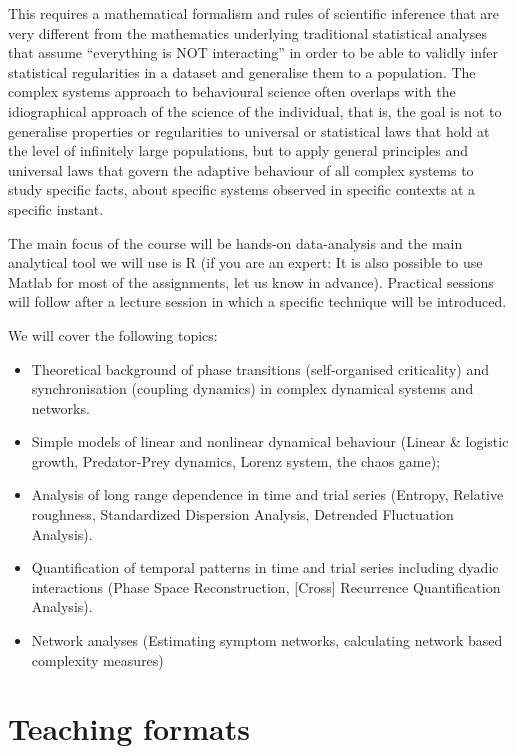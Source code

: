 \documentclass[12pt,]{book}
\providecommand{\tightlist}{%
  \setlength{\itemsep}{0pt}\setlength{\parskip}{0pt}}
\let\stdsection\section
\renewcommand\section{\newpage\stdsection}
\begin{document}
This requires a mathematical formalism and rules of scientific inference that are very different from the mathematics underlying traditional statistical analyses that assume ``everything is NOT interacting'' in order to be able to validly infer statistical regularities in a dataset and generalise them to a population. The complex systems approach to behavioural science often overlaps with the idiographical approach of the science of the individual, that is, the goal is not to generalise properties or regularities to universal or statistical laws that hold at the level of infinitely large populations, but to apply general principles and universal laws that govern the adaptive behaviour of all complex systems to study specific facts, about specific systems observed in specific contexts at a specific instant.

The main focus of the course will be hands-on data-analysis and the main analytical tool we will use is R (if you are an expert: It is also possible to use Matlab for most of the assignments, let us know in advance). Practical sessions will follow after a lecture session in which a specific technique will be introduced.

We will cover the following topics:

\begin{itemize}
\tightlist
\item
  Theoretical background of phase transitions (self-organised criticality) and synchronisation (coupling dynamics) in complex dynamical systems and networks.
\item
  Simple models of linear and nonlinear dynamical behaviour (Linear \& logistic growth, Predator-Prey dynamics, Lorenz system, the chaos game);
\item
  Analysis of long range dependence in time and trial series (Entropy, Relative roughness, Standardized Dispersion Analysis, Detrended Fluctuation Analysis).
\item
  Quantification of temporal patterns in time and trial series including dyadic interactions (Phase Space Reconstruction, {[}Cross{]} Recurrence Quantification Analysis).
\item
  Network analyses (Estimating symptom networks, calculating network based complexity measures)
\end{itemize}

\hypertarget{teaching-formats}{%
\section*{\texorpdfstring{\textbf{Teaching formats}}{Teaching formats}}\label{teaching-formats}}
\end{document}
